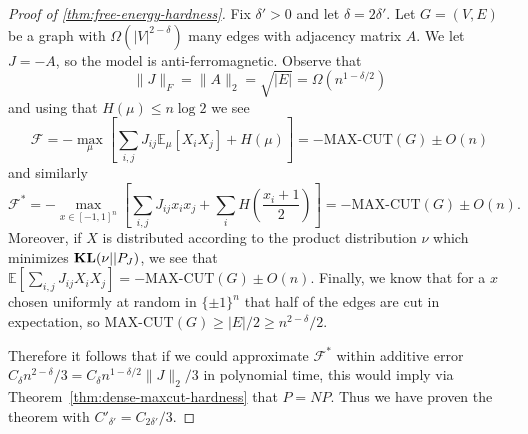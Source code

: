 \documentclass[final, 12pt]{colt2018}
\newcommand{\bE}{\mathbb{E}}
\newcommand{\F}{\mathcal{F}}
\newcommand{\E}{\bE}      %
\newcommand{\KL}{\mathop{\bf KL\/}}
\theoremstyle{definition}
\theoremstyle{plain}
\begin{document}
\begin{proof}[Proof of \cref{thm:free-energy-hardness}]
 Fix $\delta' > 0$ and let $\delta = 2\delta'$. Let $G = (V,E)$ be a graph with $\Omega(|V|^{2 - \delta})$ many edges with adjacency matrix $A$. We let
$J = -A$, so the model is anti-ferromagnetic. Observe that
\[ \|J\|_F = \|A\|_2 = \sqrt{|E|} = \Omega(n^{1 - \delta/2}) \]
and using that $H(\mu) \le n \log 2$ we see
\[ \F = -\max_{\mu}\left[\sum_{i,j} J_{ij} \E_{\mu}[X_i X_j] + H(\mu)\right] = -\text{MAX-CUT}(G) \pm O(n) \]
and similarly
\[ \F^* = -\max_{x \in [-1,1]^n} \left[ \sum_{i,j} J_{ij} x_ix_j + \sum_i H\left(\frac{x_i + 1}{2}\right)\right] = -\text{MAX-CUT}(G) \pm O(n). \]
Moreover, if $X$ is distributed according to the product distribution $\nu$
which minimizes $\KL(\nu || P_J)$, we see that $\E[\sum_{i,j} J_{ij} X_i X_j] = -\text{MAX-CUT}(G) \pm O(n)$.
Finally, we know that for a $x$ chosen uniformly at random in $\{\pm 1\}^n$ that
half of the edges are cut in expectation, so $\text{MAX-CUT}(G) \ge |E|/2 \ge n^{2 - \delta}/2$. 

Therefore it follows that if we could approximate $\F^*$ within additive error $C_{\delta} n^{2 - \delta}/3 = C_{\delta} n^{1 - \delta/2}\|J\|_2/3$ in polynomial time, this would imply
via Theorem~\ref{thm:dense-maxcut-hardness} that $P = NP$. Thus we have proven
the theorem with $C'_{\delta'} = C_{2\delta'}/3$. 
\end{proof}
\fi
\begin{comment}
\section{Application: Computing Partition Functions in $2^{O(1/\epsilon^2)}$ Time}
We sample down and get a $poly(1/\epsilon)$ size graph $H$. Now the following
approach, following our previous paper, lets us estimate the graphon free energy of $H$ in time $2^{O(1/\epsilon^2)}$:
\begin{enumerate}
\item Compute a regularity partition of $H$; call this simplified graph $H''$.
\item Use the grid-search + convex optimization algorithm of our old paper to compute the graphon free energy of $H''$:
using the arguments there, we see that this algorithm computes a good approximation to the graphon free energy. (Though not the usual free energy, because that
guarantee is only good when graphs are large.)
\item By the Lipschitz property of graphon free energy, this is a good estimate to graphon free energy of $H$, therefore also a good estimate to graphon free energy of $G$, as well as the ordinary free energy of $G$.
\end{enumerate}
\end{comment}
\end{document}
